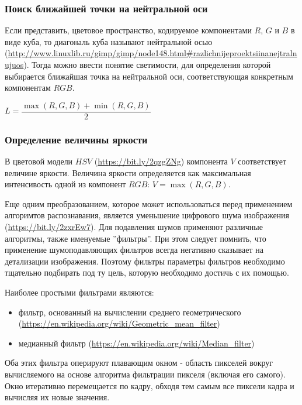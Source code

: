 \subsubsection*{Поиск ближайшей точки на нейтральной оси}

Если представить, цветовое пространство, кодируемое компонентами $R$, $G$ и $B$ в виде куба, 
то диагональ куба называют нейтральной осью (\url{http://www.linuxlib.ru/gimp/gimp/node148.html#razlichnijeproektsiinanejtralnujuos}). Тогда можно ввести понятие светимости, для определения 
которой выбирается ближайшая точка на нейтральной оси, соответствующая конкретным компонентам $RGB$.

$L = \dfrac{\max(R,G,B) + \min(R,G,B)}{2}$

\subsubsection*{Определение величины яркости}

В цветовой модели $HSV$ (\url{https://bit.ly/2qzgZNg}) компонента $V$ соответствует величине яркости. Величина яркости определяется как 
максимальная интенсивость одной из компонент $RGB$: $V = \max(R,G,B)$. 

Еще одним преобразованием, которое может использоваться перед применением алгоримтов распознавания, 
является уменьшение цифрового шума изображения (\url{https://bit.ly/2zxrEw7}). Для подавления шумов применяют различные алгоритмы, 
также именуемые ''фильтры''. При этом следует помнить, что применение шумоподавляющих фильтров всегда 
негативно сказывает на детализации изображения. Поэтому фильтры параметры фильтров необходимо тщательно 
подбирать под ту цель, которую необходимо достичь с их помощью.

Наиболее простыми фильтрами являются:

\begin{itemize}
    \item фильтр, основанный на вычислении среднего геометрического (\url{https://en.wikipedia.org/wiki/Geometric_mean_filter})
    \item медианный фильтр (\url{https://en.wikipedia.org/wiki/Median_filter})
\end{itemize}

Оба этих фильтра оперируют плавающим окном - область пикселей вокруг вычисляемого на основе алгоритма фильтрации пикселя (включая его самого). Окно итеративно перемещается по кадру, обходя тем самым все пиксели кадра и вычисляя их новые значения.

